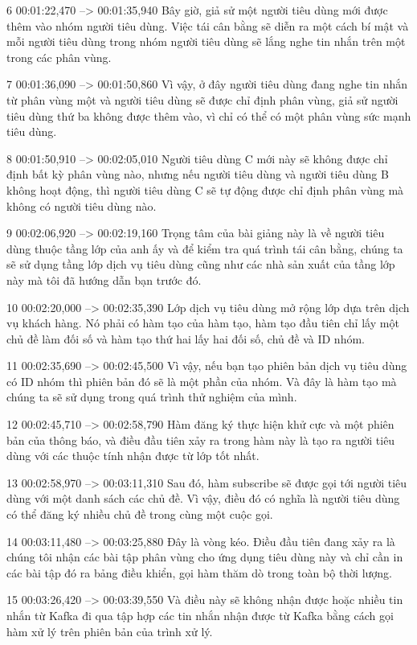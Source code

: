 6
00:01:22,470 --> 00:01:35,940
Bây giờ, giả sử một người tiêu dùng mới được thêm vào nhóm người tiêu dùng.  Việc tái cân bằng sẽ diễn ra một cách bí mật và mỗi người tiêu dùng trong nhóm người tiêu dùng sẽ lắng nghe tin nhắn trên một trong các phân vùng.

7
00:01:36,090 --> 00:01:50,860
Vì vậy, ở đây người tiêu dùng đang nghe tin nhắn từ phân vùng một và người tiêu dùng sẽ được chỉ định phân vùng, giả sử người tiêu dùng thứ ba không được thêm vào, vì chỉ có thể có một phân vùng sức mạnh tiêu dùng.

8
00:01:50,910 --> 00:02:05,010
Người tiêu dùng C mới này sẽ không được chỉ định bất kỳ phân vùng nào, nhưng nếu người tiêu dùng và người tiêu dùng B không hoạt động, thì người tiêu dùng C sẽ tự động được chỉ định phân vùng mà không có người tiêu dùng nào.

9
00:02:06,920 --> 00:02:19,160
Trọng tâm của bài giảng này là về người tiêu dùng thuộc tầng lớp của anh ấy và để kiểm tra quá trình tái cân bằng, chúng ta sẽ sử dụng tầng lớp dịch vụ tiêu dùng cũng như các nhà sản xuất của tầng lớp này mà tôi đã hướng dẫn bạn trước đó.

10
00:02:20,000 --> 00:02:35,390
Lớp dịch vụ tiêu dùng mở rộng lớp dựa trên dịch vụ khách hàng.  Nó phải có hàm tạo của hàm tạo, hàm tạo đầu tiên chỉ lấy một chủ đề làm đối số và hàm tạo thứ hai lấy hai đối số, chủ đề và ID nhóm.

11
00:02:35,690 --> 00:02:45,500
Vì vậy, nếu bạn tạo phiên bản dịch vụ tiêu dùng có ID nhóm thì phiên bản đó sẽ là một phần của nhóm.  Và đây là hàm tạo mà chúng ta sẽ sử dụng trong quá trình thử nghiệm của mình.

12
00:02:45,710 --> 00:02:58,790
Hàm đăng ký thực hiện khử cực và một phiên bản của thông báo, và điều đầu tiên xảy ra trong hàm này là tạo ra người tiêu dùng với các thuộc tính nhận được từ lớp tốt nhất.

13
00:02:58,970 --> 00:03:11,310
Sau đó, hàm subscribe sẽ được gọi tới người tiêu dùng với một danh sách các chủ đề.  Vì vậy, điều đó có nghĩa là người tiêu dùng có thể đăng ký nhiều chủ đề trong cùng một cuộc gọi.

14
00:03:11,480 --> 00:03:25,880
Đây là vòng kéo.  Điều đầu tiên đang xảy ra là chúng tôi nhận các bài tập phân vùng cho ứng dụng tiêu dùng này và chỉ cần in các bài tập đó ra bảng điều khiển, gọi hàm thăm dò trong toàn bộ thời lượng.

15
00:03:26,420 --> 00:03:39,550
Và điều này sẽ không nhận được hoặc nhiều tin nhắn từ Kafka đi qua tập hợp các tin nhắn nhận được từ Kafka bằng cách gọi hàm xử lý trên phiên bản của trình xử lý.

